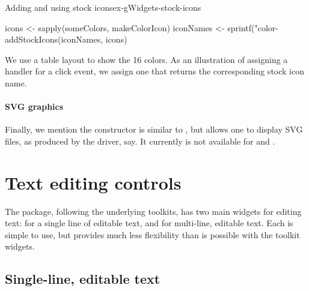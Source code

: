 \begin{example}{Adding and using stock icons}{ex-gWidgets-stock-icons}
\begin{Schunk}
\begin{Sinput}
 icons <- sapply(someColors, makeColorIcon)
 iconNames <- sprintf("color-%
 addStockIcons(iconNames, icons)
\end{Sinput}
\end{Schunk}

We use a table layout to show the 16 colors. As an illustration of
assigning a handler for a click event, we assign one that returns the
corresponding stock icon name.

\begin{Schunk}
\end{Schunk}
\end{example}

\paragraph{SVG graphics}
Finally, we mention the  constructor is similar to
, but allows one to display SVG files, as produced
by the  driver, say. It currently is not available for
 and .


\section{Text editing controls}
\label{sec:gWidgets-text-edit-contr}
The  package, following the underlying toolkits, has two
main widgets for editing text:  for a single line
of editable text, and  for multi-line, editable
text. Each is simple to use, but provides much less flexibility than
is possible with the toolkit widgets.



\subsection{Single-line, editable text}
\label{sec:gWidgets-single-line-editable}



